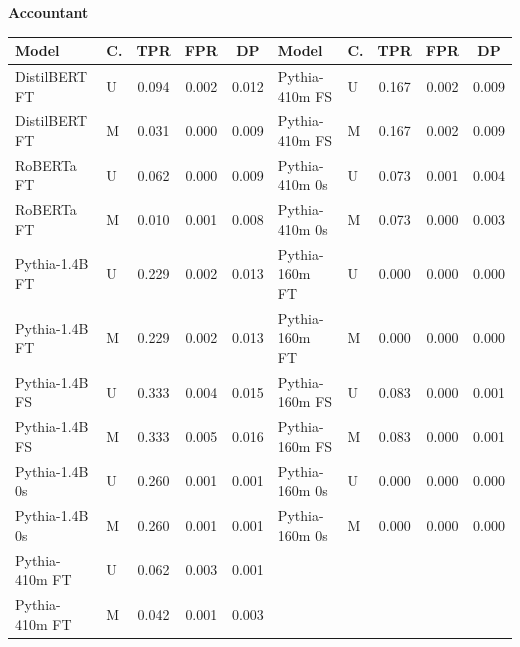 \documentclass[11pt]{article}
\begin{document}
\vspace{4pt}\noindent\textbf{Accountant}
\begin{center}\scriptsize
\begin{tabular}{llccc|llccc}
\toprule
\textbf{Model} & \textbf{C.} & \textbf{TPR} & \textbf{FPR} & \textbf{DP} & \textbf{Model} & \textbf{C.} & \textbf{TPR} & \textbf{FPR} & \textbf{DP} \\
\midrule
DistilBERT FT & U & 0.094 & 0.002 & 0.012 & Pythia-410m FS & U & 0.167 & 0.002 & 0.009 \\
DistilBERT FT & M & 0.031 & 0.000 & 0.009 & Pythia-410m FS & M & 0.167 & 0.002 & 0.009 \\
RoBERTa FT & U & 0.062 & 0.000 & 0.009 & Pythia-410m 0s & U & 0.073 & 0.001 & 0.004 \\
RoBERTa FT & M & 0.010 & 0.001 & 0.008 & Pythia-410m 0s & M & 0.073 & 0.000 & 0.003 \\
Pythia-1.4B FT & U & 0.229 & 0.002 & 0.013 & Pythia-160m FT & U & 0.000 & 0.000 & 0.000 \\
Pythia-1.4B FT & M & 0.229 & 0.002 & 0.013 & Pythia-160m FT & M & 0.000 & 0.000 & 0.000 \\
Pythia-1.4B FS & U & 0.333 & 0.004 & 0.015 & Pythia-160m FS & U & 0.083 & 0.000 & 0.001 \\
Pythia-1.4B FS & M & 0.333 & 0.005 & 0.016 & Pythia-160m FS & M & 0.083 & 0.000 & 0.001 \\
Pythia-1.4B 0s & U & 0.260 & 0.001 & 0.001 & Pythia-160m 0s & U & 0.000 & 0.000 & 0.000 \\
Pythia-1.4B 0s & M & 0.260 & 0.001 & 0.001 & Pythia-160m 0s & M & 0.000 & 0.000 & 0.000 \\
Pythia-410m FT & U & 0.062 & 0.003 & 0.001 & & & & & \\
Pythia-410m FT & M & 0.042 & 0.001 & 0.003 & & & & & \\
\bottomrule
\end{tabular}
\end{center}
\end{document}
